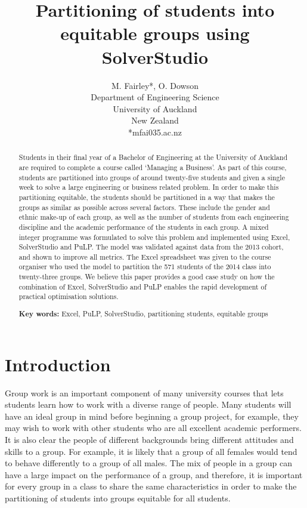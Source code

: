 \documentclass[12pt]{ORSNZ}
\title{Partitioning of students into equitable groups using SolverStudio}
\author{M. Fairley*, O. Dowson\\Department of Engineering Science\\University of
  Auckland\\New Zealand\\{*}mfai035\@@aucklanduni.ac.nz}
\date{} %
\begin{document}
\maketitle
\pagestyle{empty} \thispagestyle{empty}
\begin{abstract}
Students in their final year of a Bachelor of Engineering at the University of Auckland are required to complete a course called `Managing a Business’. As part of this course, students are partitioned into groups of around twenty-five students and given a single week to solve a large engineering or business related problem. In order to make this partitioning equitable, the students should be partitioned in a way that makes the groups as similar as possible across several factors. These include the gender and ethnic make-up of each group, as well as the number of students from each engineering discipline and the academic performance of the students in each group. A mixed integer programme was formulated to solve this problem and implemented using Excel, SolverStudio and PuLP. The model was validated against data from the 2013 cohort, and shown to improve all metrics. The Excel spreadsheet was given to the course organiser who used the model to partition the 571 students of the 2014 class into twenty-three groups. We believe this paper provides a good case study on how the combination of Excel, SolverStudio and PuLP enables the rapid development of practical optimisation solutions.

\textbf{Key words:} Excel, PuLP, SolverStudio, partitioning students, equitable groups
\end{abstract}
\section{Introduction}
Group work is an important component of many university courses that lets students learn how to work with a diverse range of people. Many students will have an ideal group in mind before beginning a group project, for example, they may wish to work with other students who are all excellent academic performers. It is also clear the people of different backgrounds bring different attitudes and skills to a group. For example, it is likely that a group of all females would tend to behave differently to a group of all males. The mix of people in a group can have a large impact on the performance of a group, and therefore, it is important for every group in a class to share the same characteristics in order to make the partitioning of students into groups equitable for all students.
\end{document}
